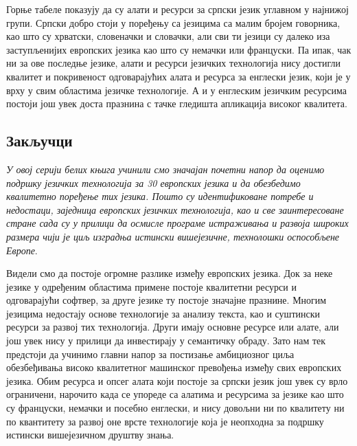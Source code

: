 \begin{multicols}{2}
Горње табеле показују да су алати и ресурси за српски језик углавном у најнижој групи. Српски добро стоји у поређењу са језицима са малим бројем говорника, као што су хрватски, словеначки и словачки, али сви ти језици су далеко иза заступљенијих европских језика као што су немачки или француски. Па ипак, чак ни за ове последње језике, алати и ресурси  језичких технологија нису достигли квалитет и покривеност одговарајућих алата и ресурса за енглески језик, који је у врху у свим областима језичке технологије. А и у енглеским језичким ресурсима постоји још увек доста празнина с тачке гледишта апликација високог квалитета.



 \subsection {Закључци}
   
\textit{У овој серији белих књига учинили смо значајан почетни напор да оценимо подршку језичких технологија за 30 европских језика и да обезбедимо квалитетно поређење тих језика. Пошто су идентификоване потребе и недостаци, заједница европских језичких технологија, као и све заинтересоване стране сада су у прилици да осмисле програме истраживања и развоја широких размера чији је циљ изградња истински вишејезичне,  технолошки оспособљене Европе}.

Видели смо да постоје огромне разлике између европских језика. Док за неке језике у одређеним областима примене постоје квалитетни ресурси и  одговарајући софтвер, за друге језике ту постоје значајне празнине. Многим језицима недостају основе технологије за анализу текста, као и суштински ресурси за развој тих технологија. Други имају основне ресурсе или алате, али још увек нису у прилици да инвестирају у семантичку обраду. Зато нам тек предстоји да учинимо главни напор за постизање амбициозног циља обезбеђивања високо квалитетног машинског превођења између свих европских језика.  
Обим ресурса и опсег алата који постоје за српски језик још увек су врло ограничени, нарочито када се упореде са алатима и ресурсима за језике као што су француски, немачки и посебно енглески, и нису довољни ни по квалитету ни по квантитету за развој оне врсте технологије која је неопходна за подршку истински вишејезичном друштву знања. 


\end{multicols}
